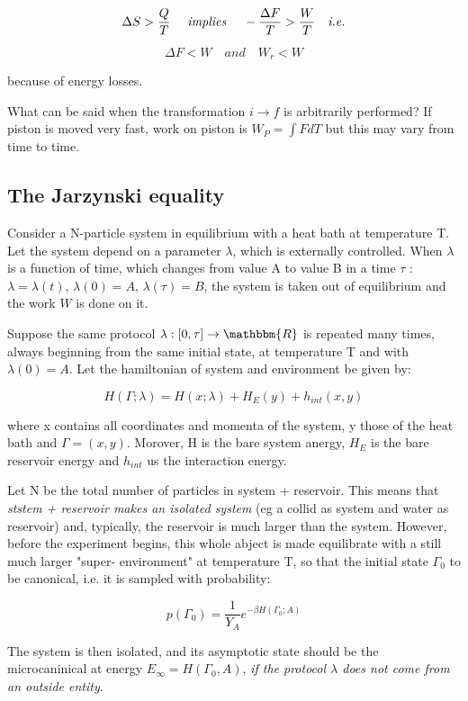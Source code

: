 \documentclass{article}
\begin{document}
$$\Delta S > \frac{Q}{T} \quad \textit{ implies } \quad - \frac{\Delta F}{T} > \- \frac{W}{T} \quad \textit{i.e.}$$


$$\Delta F < W \quad \textit{and} \quad W_r < W$$

because of energy losses.

What can be said when the transformation $i \to f$ is arbitrarily performed? If piston is moved very fast, work on piston is $W_P = \int F dT$ but this may vary from time to time.

\subsection{The Jarzynski equality}

Consider a N-particle system in equilibrium with a heat bath at temperature T. Let the system depend on a parameter $\lambda$, which is externally controlled. When $\lambda$ is a function of time, which changes from value A to value B in a time  $\tau$ : $\lambda = \lambda(t)$, $\lambda(0) = A$, $\lambda(\tau) = B$, the system is taken out of equilibrium and the work $W$ is done on it.

Suppose the same protocol $\lambda:[0,\tau] \to \mathbbm{R}$ is repeated many times, always beginning from the same initial state, at temperature T and with $\lambda(0) = A $. Let the hamiltonian of system and environment be given by:

\begin{equation}
H(\Gamma;\lambda) = H(x;\lambda) + H_E(y) + h_{int}(x,y)
\end{equation}

where x contains all coordinates and momenta of the system, y those of the heat bath and $\Gamma = (x,y)$. Morover, H is the bare system anergy, $H_E$ is the bare reservoir energy and $h_ {int}$ us the interaction energy. 

Let N be the total number of particles in system + reservoir. This means that \emph{ststem + reservoir makes an isolated system} (eg a collid as system and water as reservoir) and, typically, the reservoir is much larger than the system. However, before the experiment begins, this whole abject is made equilibrate with a still much larger "super- environment" at temperature T, so that the initial state $\Gamma_0$ to be canonical, i.e. it is sampled with probability:

$$p(\Gamma_0) = \frac{1}{Y_A} e^{-\beta H(\Gamma_0;A)}$$

The system is then isolated, and its asymptotic state should be the microcaninical at energy $E_{\infty} = H(\Gamma_0,A)$, \emph{if the protocol $\lambda$ does not come from an outside entity}.
\end{document}

